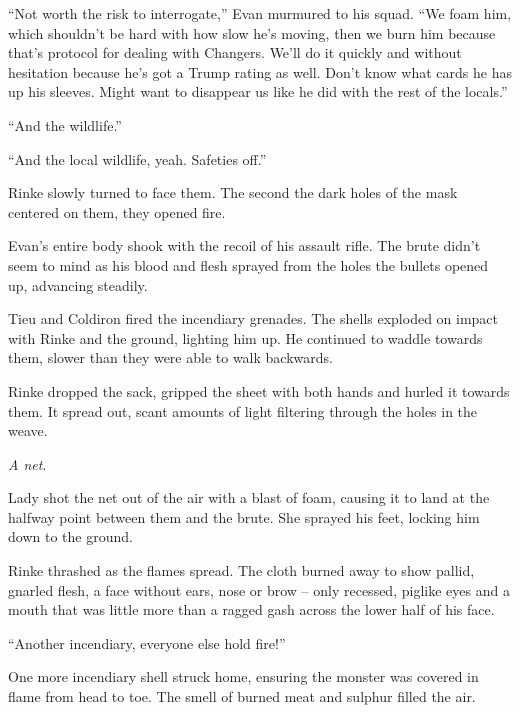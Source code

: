 ``Not worth the risk to interrogate,'' Evan murmured to his squad.  ``We foam him, which shouldn't be hard with how slow he's moving, then we burn him because that's protocol for dealing with Changers.  We'll do it quickly and without hesitation because he's got a Trump rating as well.  Don't know what cards he has up his sleeves.  Might want to disappear us like he did with the rest of the locals.''



``And the wildlife.''



``And the local wildlife, yeah.  Safeties off.''



Rinke slowly turned to face them.  The second the dark holes of the mask centered on them, they opened fire.



Evan's entire body shook with the recoil of his assault rifle.  The brute didn't seem to mind as his blood and flesh sprayed from the holes the bullets opened up, advancing steadily.



Tieu and Coldiron fired the incendiary grenades.  The shells exploded on impact with Rinke and the ground, lighting him up.  He continued to waddle towards them, slower than they were able to walk backwards.



Rinke dropped the sack, gripped the sheet with both hands and hurled it towards them.  It spread out, scant amounts of light filtering through the holes in the weave.



\emph{A net}.



Lady shot the net out of the air with a blast of foam, causing it to land at the halfway point between them and the brute.  She sprayed his feet, locking him down to the ground.



Rinke thrashed as the flames spread.  The cloth burned away to show pallid, gnarled flesh, a face without ears, nose or brow – only recessed, piglike eyes and a mouth that was little more than a ragged gash across the lower half of his face.



``Another incendiary, everyone else hold fire!''



One more incendiary shell struck home, ensuring the monster was covered in flame from head to toe.  The smell of burned meat and sulphur filled the air.



